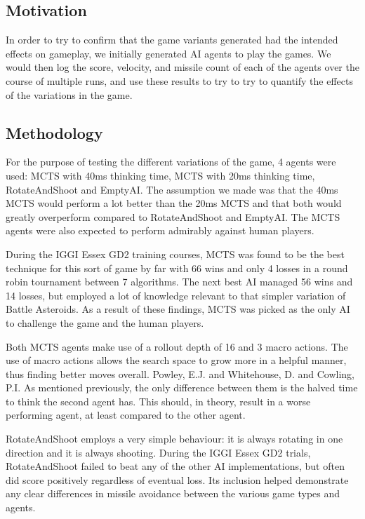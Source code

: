 \subsection{Motivation}
In order to try to confirm that the game variants generated had the intended effects on gameplay, we initially generated AI agents to play the games. We would then log the score, velocity, and missile count of each of the agents over the course of multiple runs, and use these results to try to try to quantify the effects of the variations in the game.

\subsection{Methodology}


For the purpose of testing the different variations of the game, 4 agents were used: MCTS with 40ms thinking time, MCTS with 20ms thinking time, RotateAndShoot and EmptyAI.
The assumption we made was that the 40ms MCTS would perform a lot better than the 20ms MCTS and that both would greatly overperform compared to RotateAndShoot and EmptyAI. The MCTS agents were also expected to perform admirably against human players.

During the IGGI Essex GD2 training courses, MCTS was found to be the best technique for this sort of game by far with 66 wins and only 4 losses in a round robin tournament between 7 algorithms. The next best AI managed 56 wins and 14 losses, but employed a lot of knowledge relevant to that simpler variation of Battle Asteroids. As a result of these findings, MCTS was picked as the only AI to challenge the game and the human players.

Both MCTS agents make use of a rollout depth of 16 and 3 macro actions. The use of macro actions allows the search space to grow more in a helpful manner, thus finding better moves overall. {Powley, E.J. and Whitehouse, D. and Cowling, P.I.} As mentioned previously, the only difference between them is the halved time to think the second agent has. This should, in theory, result in a worse performing agent, at least compared to the other agent.

RotateAndShoot employs a very simple behaviour: it is always rotating in one direction and it is always shooting. During the IGGI Essex GD2 trials, RotateAndShoot failed to beat any of the other AI implementations, but often did score positively regardless of eventual loss. Its inclusion helped demonstrate any clear differences in missile avoidance between the various game types and agents.

